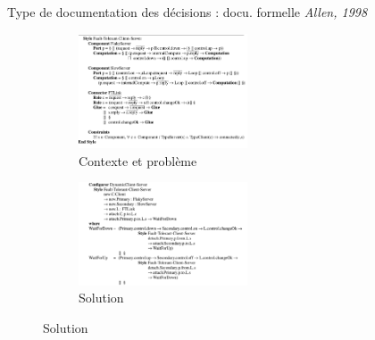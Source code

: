 \begin{frame}[fragile]{Type de documentation des décisions : docu.
formelle \emph{Allen, 1998}}
\centering
\begin{figure}
\begin{subfigure}[b]{0.4\textwidth}
\includegraphics[width=5cm]{imgs/slide_fault-tolerance.png}
\caption{Contexte et problème}
\end{subfigure}
\begin{subfigure}[b]{0.4\textwidth}
\includegraphics[width=5cm]{imgs/slide_reconf_specif.png}
\caption{Solution}
\end{subfigure}
\end{figure}

\begin{table}[]
\end{table}
\end{frame}

